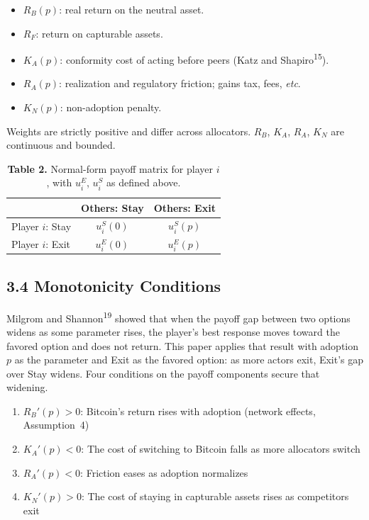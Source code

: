 \documentclass[12pt]{article}
\theoremstyle{definition}
\theoremstyle{remark}
\begin{document}
\begin{itemize}[nosep,leftmargin=*]
\item $R_B(p)$: real return on the neutral asset.
\item $R_F$: return on capturable assets.
\item $K_A(p)$: conformity cost of acting before peers (Katz and Shapiro\textsuperscript{15}).
\item $R_A(p)$: realization and regulatory friction; gains tax, fees, \textit{etc}.
\item $K_N(p)$: non-adoption penalty.
\end{itemize}

\smallskip
\noindent Weights are strictly positive and differ across allocators. $R_B$, $K_A$, $R_A$, $K_N$ are continuous and bounded.

\begin{table}[h]
\centering
\caption*{\textbf{Table 2.} Normal-form payoff matrix for player $i$, with $u_i^E$, $u_i^S$ as defined above.}
\begin{tabular}{lcc}
\toprule
 & Others: Stay & Others: Exit \\
\midrule
Player $i$: Stay & $u_i^S(0)$ & $u_i^S(p)$ \\
Player $i$: Exit & $u_i^E(0)$ & $u_i^E(p)$ \\
\bottomrule
\end{tabular}
\end{table}

\subsection{3.4 Monotonicity Conditions}

Milgrom and Shannon\textsuperscript{19} showed that when the payoff
gap between two options widens as some parameter rises, the player's
best response moves toward the favored option and does not return.
This paper applies that result with adoption $p$ as the parameter
and Exit as the favored option: as more actors exit, Exit's gap
over Stay widens. Four conditions on the payoff components secure
that widening.

\begin{enumerate}[label=(M\arabic*),nosep]
\item $R_B'(p) > 0$: Bitcoin's return rises with adoption (network effects, Assumption~4)
\item $K_A'(p) < 0$: The cost of switching to Bitcoin falls as more allocators switch
\item $R_A'(p) < 0$: Friction eases as adoption normalizes
\item $K_N'(p) > 0$: The cost of staying in capturable assets rises as competitors exit
\end{enumerate}
\end{document}
